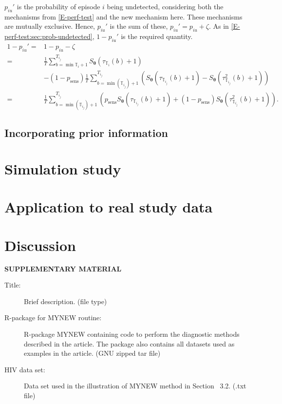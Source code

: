 \documentclass[12pt]{article}
\renewcommand{\vec}[1]{\bm{#1}}
\newcommand{\sched}{\mathbb{T}}
\begin{document}
$p_{iu}'$ is the probability of episode $i$ being undetected, considering both the mechanisms from \cref{E-perf-test} and the new mechanism here.
These mechanisms are mutually exclusive.
Hence, $p_{iu}'$ is the sum of these, $p_{iu}' = p_{iu} + \zeta$.
As in \cref{E-perf-test:sec:prob-undetected}, $1 - p_{iu}'$ is the required quantity.
\begin{align}
1 - p_{iu}'
=& 1 - p_{iu} - \zeta \\
=& \frac{1}{T} \sum_{b = \min \sched_{i} + 1}^{T_{i_j}} S_{\vec{\theta}}(\tau_{\sched_{i}}(b) + 1) \\
&- (1 - p_\text{sens})\frac{1}{T} \sum_{b=\min(\sched_{i_j}) + 1}^{T_{i_j}} \left( S_{\vec{\theta}}(\tau_{\sched_{i_j}}(b) + 1) - S_{\vec{\theta}}(\tau^2_{\sched_{i_j}}(b) + 1) \right) \\
=& \frac{1}{T} \sum_{b=\min(\sched_{i_j}) + 1}^{T_{i_j}} \left( p_\text{sens} S_{\vec{\theta}}(\tau_{\sched_{i_j}}(b) + 1) + (1 - p_\text{sens}) S_{\vec{\theta}}(\tau^2_{\sched_{i_j}}(b) + 1)\right).
\label{imperf-test:eq:pit-prime}
\end{align}


\subsection{Incorporating prior information}

\section{Simulation study}

\section{Application to real study data}

\section{Discussion}

\bigskip
\begin{center}
{\large\bf SUPPLEMENTARY MATERIAL}
\end{center}

\begin{description}

\item[Title:] Brief description. (file type)

\item[R-package for  MYNEW routine:] R-package MYNEW containing code to perform the diagnostic methods described in the article. The package also contains all datasets used as examples in the article. (GNU zipped tar file)

\item[HIV data set:] Data set used in the illustration of MYNEW method in Section~ 3.2. (.txt file)

\end{description}
\end{document}
